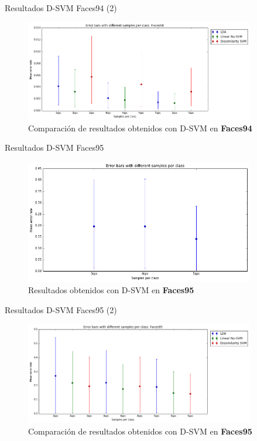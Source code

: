 \documentclass{beamer}
\begin{document}
\begin{frame}{Resultados D-SVM Faces94 (2)}
\begin{figure}[htpb!]
\centering
\includegraphics[width=10cm]{dsvm_rescomp94}
\caption{Comparación de resultados obtenidos con D-SVM en \textbf{Faces94}}
\end{figure}
\end{frame}

\begin{frame}{Resultados D-SVM Faces95}
\begin{figure}[htpb!]
\centering
\includegraphics[width=10cm]{dsvm_res95}
\caption{Resultados obtenidos con D-SVM en \textbf{Faces95}}
\end{figure}
\end{frame}

\begin{frame}{Resultados D-SVM Faces95 (2)}
\begin{figure}[htpb!]
\centering
\includegraphics[width=10cm]{dsvm_rescomp95}
\caption{Comparación de resultados obtenidos con D-SVM en \textbf{Faces95}}
\end{figure}
\end{frame}
\end{document}

